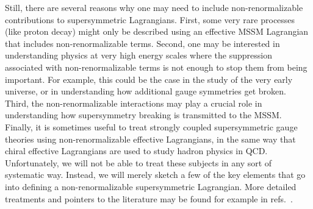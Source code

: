 \documentclass[11pt]{article}
\begin{document}
Still, there are several reasons why one may need to include 
non-renormalizable contributions to supersymmetric Lagrangians. First, 
some very rare processes (like proton decay) might only be described using 
an effective MSSM Lagrangian that includes non-renormalizable terms. 
Second, one may be interested in understanding physics at very high 
energy scales where the suppression associated with non-renormalizable 
terms is not enough to stop them from being important. For example, this 
could be the case in the study of the very early universe, or in 
understanding how additional gauge symmetries get broken. Third, the 
non-renormalizable interactions may play a crucial role in understanding 
how supersymmetry breaking is transmitted to the MSSM. Finally, it is 
sometimes useful to treat strongly coupled supersymmetric gauge theories 
using non-renormalizable effective Lagrangians, in the same way that 
chiral effective Lagrangians are used to study hadron physics in QCD. 
Unfortunately, we will not be able to treat these subjects in any sort of 
systematic way. Instead, we will merely sketch a few of the key elements 
that go into defining a non-renormalizable supersymmetric Lagrangian. 
More detailed treatments and pointers to the literature may be found for example in 
refs.~\cite{WessBaggerbook,Westbook,BailinLovebook,Buchbinder:1998qv,
Weinbergbook,Freedman:2012zz,Shifman:2012zz,Nillesreview,GGRS,VNreview,Bertolini:2013via}.
\end{document}
